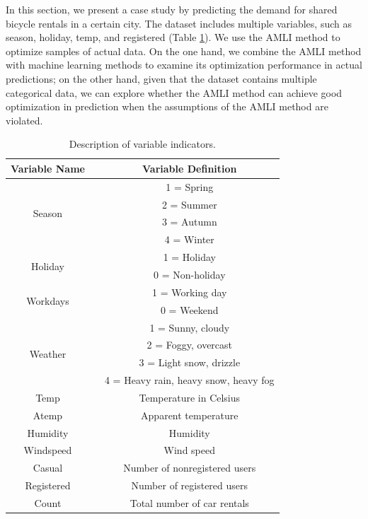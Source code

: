 \documentclass[mathematics,article,accept,pdftex,moreauthors]{Definitions/mdpi}
\begin{document}
In this section, we present a case study by predicting the demand for shared bicycle rentals in a certain city. The dataset includes multiple variables, such as season, holiday, temp, and registered (Table \ref{tab4}). We use the AMLI method to optimize samples of actual data. On the one hand, we combine the AMLI method with machine learning methods to examine its optimization performance in actual predictions; on the other hand, given that the dataset contains multiple categorical data, we can explore whether the AMLI method can achieve good optimization in prediction when the assumptions of the AMLI method are violated.


\begin{table}[H]
	\caption{Description of variable indicators.}
	\label{tab4}
	{\renewcommand{\tabcolsep}{10.45mm}
		\small\begin{tabular}{ccc}
			\toprule
		 \textbf{Variable Name} & & \textbf{Variable Definition} \\
		\midrule
		 \multirow{4}{1.5cm}{Season} & & 1 = Spring \\
		 & &2 = Summer
		 \\
		 & & 3 = Autumn\\
		 & & 4 = Winter\\
		 \multirow{2}{1.5cm}{Holiday} & & 1 = Holiday\\
		 & & 0 = Non-holiday \\
		 \multirow{2}{1.8cm}{Workdays} & & 1 = Working day \\
		 & & 0 = Weekend \\
		 \multirow{4}{1.5cm}{Weather} & & 1 = Sunny, cloudy \\
		 & & 2 = Foggy, overcast \\
		 & & 3 = Light snow, drizzle \\
		 & & 4 = Heavy rain, heavy snow, heavy fog \\
		 Temp & & Temperature in Celsius \\
		 Atemp & & Apparent temperature \\
		 Humidity & & Humidity \\
		 Windspeed & & Wind speed \\
		 Casual & & Number of nonregistered users \\
		 Registered & & Number of registered users \\
		 Count & & Total number of car rentals \\
		\bottomrule
	\end{tabular}}
\end{table}
\end{document}
